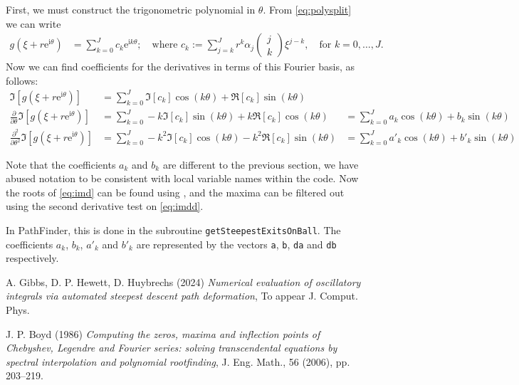 \documentclass[12pt]{article}
\newcommand{\re}{\mathrm{e}}
\newcommand{\ri}{\mathrm{i}}
\begin{document}
First, we must construct the trigonometric polynomial in $\theta$. From \eqref{eq:polysplit} we can write
\begin{align*}
	g(\xi+r\re^{\ri \theta}) &=
	\sum_{k=0}^J c_k\re^{\ri k \theta};\quad\text{where }c_k:=\sum_{j=k}^Jr^k \alpha_j\left(\begin{array}{c}
		j\\k
	\end{array}\right)
	\xi^{j-k},\quad\text{for }k=0,\ldots,J.
\end{align*}
Now we can find coefficients for the derivatives in terms of this Fourier basis, as follows:
\begin{align}
\Im\left[g(\xi+r\re^{\ri \theta})\right] &= \sum_{k=0}^J \Im [c_k]\cos(k\theta) + \Re[c_k]\sin(k\theta) \nonumber\\
\frac{\partial}{\partial\theta}\Im\left[g(\xi+r\re^{\ri \theta})\right] &= \sum_{k=0}^J -k\Im [c_k]\sin(k\theta) + k\Re[c_k]\cos(k\theta) &= \sum_{k=0}^Ja_k\cos(k\theta)+b_k\sin(k\theta)\label{eq:imd}\\
\frac{\partial^2}{\partial\theta^2}\Im\left[g(\xi+r\re^{\ri \theta})\right] &= \sum_{k=0}^J -k^2\Im [c_k]\cos(k\theta) - k^2\Re[c_k]\sin(k\theta) &= \sum_{k=0}^Ja'_k\cos(k\theta)+b'_k\sin(k\theta)\label{eq:imdd}
\end{align}

Note that the coefficients $a_k$ and $b_k$ are different to the previous section, we have abused notation to be consistent with local variable names within the code. Now the roots of \eqref{eq:imd} can be found using \cite{boyd}, and the maxima can be filtered out using the second derivative test on \eqref{eq:imdd}.

In PathFinder, this is done in the subroutine \texttt{getSteepestExitsOnBall}. The coefficients $a_k$, $b_k$, $a'_k$ and $b'_k$ are represented by the vectors \texttt{a}, \texttt{b}, \texttt{da} and \texttt{db} respectively.

\begin{thebibliography}{9}
	
	A. Gibbs, D. P. Hewett, D. Huybrechs (2024) \emph{Numerical evaluation of oscillatory integrals via automated steepest descent path deformation}, To appear J. Comput. Phys.
	
	J. P. Boyd (1986) \emph{Computing the zeros, maxima and inflection points of Chebyshev, Legendre and Fourier series: solving transcendental equations by spectral interpolation and polynomial rootfinding}, J. Eng. Math., 56 (2006), pp. 203–219.
	
	
\end{thebibliography}
	
\end{document}
